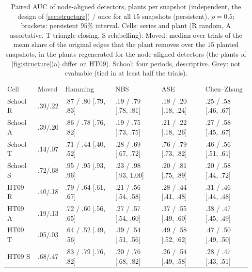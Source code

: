 \documentclass[11pt]{article}
\let\dsmidrule\midrule
\renewcommand{\midrule}{\arrayrulecolor{dsrule}\dsmidrule\arrayrulecolor{dsnavy}}
\theoremstyle{dsplain}
\theoremstyle{definition}
\begin{document}
\begin{table}[!htb]
  \centering
  \caption{Paired AUC of node-aligned detectors, plants per snapshot (independent, the design of
  \cref{sec:structure})
  / once for all $15$ snapshots (persistent), $\rho = 0.5$; brackets: persistent $95\%$ interval.
  Cells: series and plant (R random, A assortative, T triangle-closing, S relabelling).
  Moved: median over trials of the mean share of the original edges that the plant removes over the $15$
  planted snapshots, in the plants regenerated for the node-aligned detectors (the plants of
  \cref{fig:structure}(a) differ on HT09). School: four
  periods, descriptive. Grey: not evaluable (tied in at least half the trials).}
  \label{tab:persist}
  \scriptsize
  \setlength{\tabcolsep}{3pt}
  \begin{tabular}{llllll}
    \toprule
    Cell & Moved & Hamming & NBS & ASE & Chen--Zhang \\
    \midrule
    School R & .39/.22 & .87 / .80 [.79, .83] & .19 / .79 [.78, .81] & .18 / .20 [.18, .24] & .25 / \textcolor{dsgrey}{.58 [.46, .67]} \\
    School A & .39/.20 & .86 / .78 [.76, .82] & .19 / .75 [.73, .75] & .21 / .22 [.18, .26] & .27 / \textcolor{dsgrey}{.58 [.45, .67]} \\
    School T & .14/.07 & .71 / .44 [.40, .52] & .28 / .69 [.67, .72] & .76 / .79 [.73, .82] & \textcolor{dsgrey}{.46} / \textcolor{dsgrey}{.56 [.51, .61]} \\
    School S & .72/.68 & .95 / .95 [.93, .96] & .23 / .98 [.93, 1.00] & .20 / .81 [.75, .89] & .20 / .58 [.44, .72] \\
    HT09 R & .40/.18 & .79 / \textcolor{dsgrey}{.64 [.61, .67]} & .21 / .56 [.54, .58] & .28 / .44 [.41, .48] & .31 / \textcolor{dsgrey}{.46 [.44, .48]} \\
    HT09 A & .19/.13 & .72 / \textcolor{dsgrey}{.60 [.56, .65]} & .27 / \textcolor{dsgrey}{.57 [.54, .60]} & .37 / .55 [.49, .60] & \textcolor{dsgrey}{.38} / \textcolor{dsgrey}{.47 [.45, .49]} \\
    HT09 T & .05/.03 & \textcolor{dsgrey}{.64} / \textcolor{dsgrey}{.52 [.49, .56]} & \textcolor{dsgrey}{.39} / \textcolor{dsgrey}{.54 [.51, .56]} & \textcolor{dsgrey}{.49} / \textcolor{dsgrey}{.58 [.52, .62]} & \textcolor{dsgrey}{.47} / \textcolor{dsgrey}{.50 [.49, .50]} \\
    HT09 S & .68/.47 & .83 / .79 [.76, .82] & .20 / .76 [.68, .82] & .26 / .54 [.49, .58] & .28 / \textcolor{dsgrey}{.47 [.43, .51]} \\
    \bottomrule
  \end{tabular}
\end{table}
\end{document}
